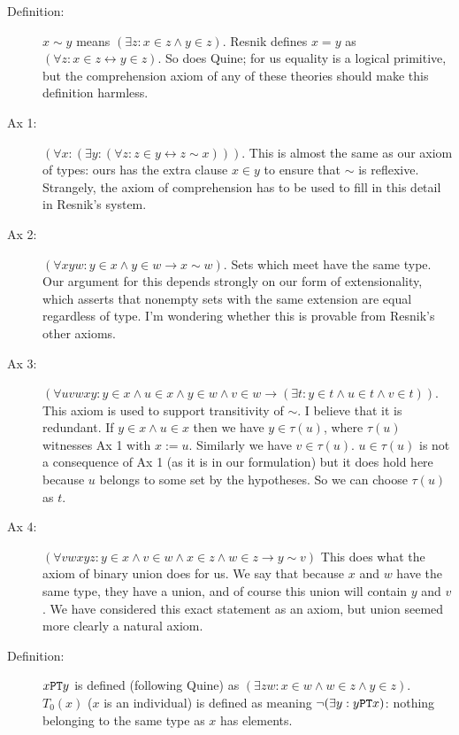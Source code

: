 \documentclass[12pt]{article}
\begin{document}
\begin{description}

\item[Definition:]  $x \sim y$ means $(\exists z:x \in z \wedge y \in z)$.  Resnik defines
$x=y$ as $(\forall z:x \in z \leftrightarrow y \in z)$.  So does Quine; for us equality is a logical primitive, but the comprehension axiom
of any of these theories should make this definition harmless.

\item[Ax 1:]  $(\forall x:(\exists y:(\forall z:z \in y \leftrightarrow z \sim x)))$.  This is almost the same as our axiom of types:  ours has the extra clause $x \in y$ to ensure that $\sim$ is reflexive.  Strangely, the axiom of comprehension has to be used to fill in this detail in Resnik's system.

\item[Ax 2:] $(\forall xyw:y \in x \wedge y \in w \rightarrow x \sim w)$.  Sets which meet have the same type.   Our argument for this depends strongly on our form of extensionality, which asserts that nonempty sets with the same extension are equal regardless of type.  I'm wondering whether this is provable from Resnik's other axioms.  

\item[Ax 3:]  $(\forall uvwxy:  y \in x \wedge u \in x \wedge y \in w \wedge v \in w \rightarrow (\exists t:y \in t \wedge u \in t \wedge v \in t))$.  This axiom is used to support transitivity of $\sim$.  I believe that it is redundant.  If $y \in x \wedge u \in x$ then we have $y \in \tau(u)$, where $\tau(u)$ witnesses
Ax 1 with $x := u$.  Similarly we have $v \in \tau(u)$.  $u \in \tau(u)$ is not a consequence of Ax 1 (as it is in our formulation) but it does hold here because
$u$ belongs to some set by the hypotheses.  So we can choose $\tau(u)$ as $t$.

\item[Ax 4:]  $(\forall vwxyz:y \in x \wedge v \in w \wedge x \in z \wedge w \in z \rightarrow y \sim v)$  This does what the axiom of binary union does for us.  We say that because $x$ and $w$ have the same type, they have a union, and of course this union will contain $y$ and $v$.  We have considered this exact statement as an axiom, but union seemed more clearly a natural axiom.

\item[Definition:]  $x {\tt PT} y$ is defined (following Quine) as $(\exists zw:x \in w \wedge w \in z \wedge y \in z)$.  $T_0(x)$ ($x$ is an individual)
is defined as meaning $\neg(\exists y:y {\tt PT} x)$:  nothing belonging to the same type as $x$ has elements.


\end{description}
\end{document}
